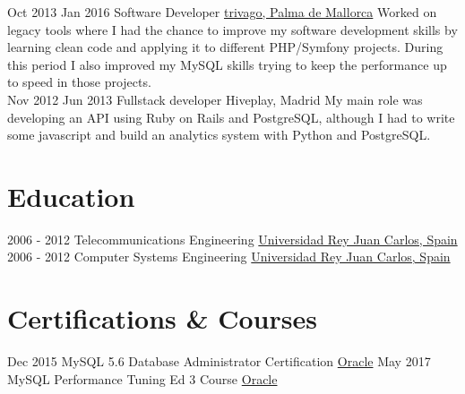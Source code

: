 \documentclass[letterpaper]{twentysecondcv} %
\begin{document}
\begin{twenty}
\twentyitem
   		{Oct 2013}
		{Jan 2016}
        {Software Developer}
        {\href{https://www.trivago.com}{trivago, Palma de Mallorca}}
        {Worked on legacy tools where I had the chance to improve my software development skills by learning clean code and applying it to different PHP/Symfony projects. During this period I also improved my MySQL skills trying to keep the performance up to speed in those projects.}
        \\
\twentyitem
    	{Nov 2012}
		{Jun 2013}
        {Fullstack developer}
        {Hiveplay, Madrid}
		{My main role was developing an API using Ruby on Rails and PostgreSQL, although I had to write some javascript and build an analytics system with Python and PostgreSQL.}
        \\
\end{twenty}

\section{Education}

\begin{twenty} %
	\twentyitem
    	{2006 - 2012}
        {}
        {Telecommunications Engineering}
        {\href{https://www.urjc.es/}{Universidad Rey Juan Carlos, Spain}}
        {}
        {}
	\twentyitem
    	{2006 - 2012}
		{}
        {Computer Systems Engineering}
        {\href{https://www.urjc.es/}{Universidad Rey Juan Carlos, Spain}}
        {}
        {}
\end{twenty}

\section{Certifications \& Courses}

\begin{twenty} %
	\twentyitem
    	{Dec 2015}
        {}
        {MySQL 5.6 Database Administrator Certification}
        {\href{https://education.oracle.com/pls/web_prod-plq-dad/db_pages.getpage?page_id=5001&get_params=p_exam_id:1Z0-883}{Oracle}}
        {}
        {}
	\twentyitem
    	{May 2017}
		{}
        {MySQL Performance Tuning Ed 3 Course}
        {\href{https://education.oracle.com/pls/web_prod-plq-dad/db_pages.getpage?page_id=609&get_params=dc:D66439,clang:EN}{Oracle}}
        {}
        {}
\end{twenty}
\end{document}
